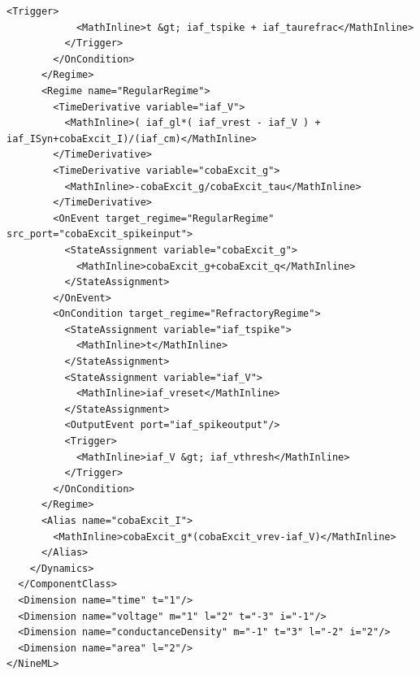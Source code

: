 \documentclass[draftspec]{ninemlspec}
\begin{document}
\begin{lstlisting}[style=XML]
          <Trigger>
            <MathInline>t &gt; iaf_tspike + iaf_taurefrac</MathInline>
          </Trigger>
        </OnCondition>
      </Regime>
      <Regime name="RegularRegime">
        <TimeDerivative variable="iaf_V">
          <MathInline>( iaf_gl*( iaf_vrest - iaf_V ) + iaf_ISyn+cobaExcit_I)/(iaf_cm)</MathInline>
        </TimeDerivative>
        <TimeDerivative variable="cobaExcit_g">
          <MathInline>-cobaExcit_g/cobaExcit_tau</MathInline>
        </TimeDerivative>
        <OnEvent target_regime="RegularRegime" src_port="cobaExcit_spikeinput">
          <StateAssignment variable="cobaExcit_g">
            <MathInline>cobaExcit_g+cobaExcit_q</MathInline>
          </StateAssignment>
        </OnEvent>
        <OnCondition target_regime="RefractoryRegime">
          <StateAssignment variable="iaf_tspike">
            <MathInline>t</MathInline>
          </StateAssignment>
          <StateAssignment variable="iaf_V">
            <MathInline>iaf_vreset</MathInline>
          </StateAssignment>
          <OutputEvent port="iaf_spikeoutput"/>
          <Trigger>
            <MathInline>iaf_V &gt; iaf_vthresh</MathInline>
          </Trigger>
        </OnCondition>
      </Regime>
      <Alias name="cobaExcit_I">
        <MathInline>cobaExcit_g*(cobaExcit_vrev-iaf_V)</MathInline>
      </Alias>
    </Dynamics>
  </ComponentClass>
  <Dimension name="time" t="1"/>
  <Dimension name="voltage" m="1" l="2" t="-3" i="-1"/>
  <Dimension name="conductanceDensity" m="-1" t="3" l="-2" i="2"/>
  <Dimension name="area" l="2"/>
</NineML>
\end{lstlisting}

~
\end{document}
